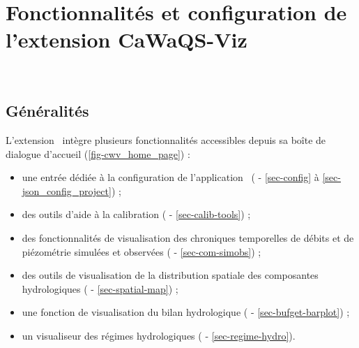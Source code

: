 \chapter{Fonctionnalités et configuration de l'extension CaWaQS-Viz}
\label{chap-user}

\renewcommand{\headrulewidth}{0.3pt}
\fancyhead[LE]{\thepage} \fancyhead[RE]{\nouppercase{\textbf{\leftmark}}}
\fancyhead[RO]{\thepage} \fancyhead[LO]{\nouppercase{\textbf{\rightmark}}}
\fancyfoot[L,C,R]{}

\setlength{\parindent}{0.35cm}

\minitoc
\newpage
\

\newpage


\section{Généralités}
\label{sec-generalites}

L'extension \cwv~intègre plusieurs fonctionnalités accessibles depuis sa boîte de
dialogue d'accueil (\cref{fig-cwv_home_page}) :
\begin{itemize}
    \item une entrée dédiée à la configuration de l'application \cawaqs~(
        - \cref{sec-config} à \ref{sec-json_config_project}) ;

    \item des outils d'aide à la calibration ( - \cref{sec-calib-tools})
        ;

    \item des fonctionnalités de visualisation des chroniques temporelles de débits
        et de piézométrie simulées et observées ( - \cref{sec-com-simobs})
        ;

    \item des outils de visualisation de la distribution spatiale des composantes
        hydrologiques ( - \cref{sec-spatial-map}) ;

    \item une fonction de visualisation du bilan hydrologique (
        - \cref{sec-bufget-barplot}) ;

    \item un visualiseur des régimes hydrologiques ( - \cref{sec-regime-hydro}).
\end{itemize}

